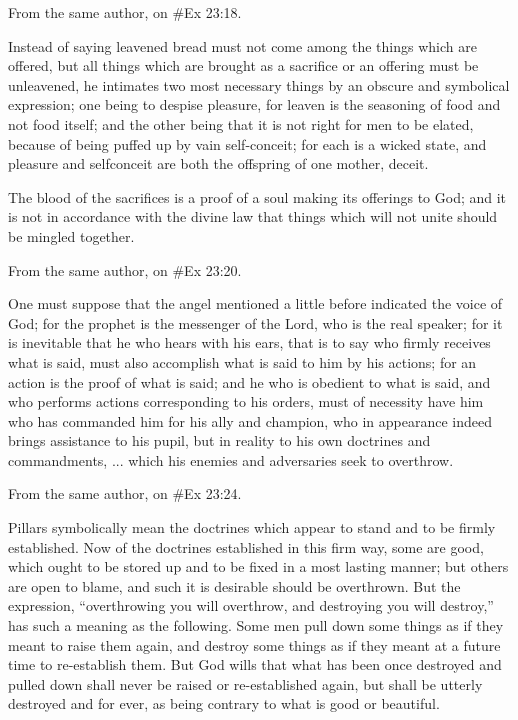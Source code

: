 From the same author, on \#Ex 23:18.

Instead of saying leavened bread must not come among the things which are offered, but all things
which are brought as a sacrifice or an offering must be unleavened, he intimates two most
necessary things by an obscure and symbolical expression; one being to despise pleasure, for
leaven is the seasoning of food and not food itself; and the other being that it is not right for men to
be elated, because of being puffed up by vain self-conceit; for each is a wicked state, and
pleasure and selfconceit are both the offspring of one mother, deceit.

The blood of the sacrifices is a proof of a soul making its offerings to God; and it is not in
accordance with the divine law that things which will not unite should be mingled together.

From the same author, on \#Ex 23:20.

One must suppose that the angel mentioned a little before indicated the voice of God; for the
prophet is the messenger of the Lord, who is the real speaker; for it is inevitable that he who hears
with his ears, that is to say who firmly receives what is said, must also accomplish what is said to
him by his actions; for an action is the proof of what is said; and he who is obedient to what is said,
and who performs actions corresponding to his orders, must of necessity have him who has
commanded him for his ally and champion, who in appearance indeed brings assistance to his
pupil, but in reality to his own doctrines and commandments, ... which his enemies and adversaries
seek to overthrow.

From the same author, on \#Ex 23:24.

Pillars symbolically mean the doctrines which appear to stand and to be firmly established. Now of
the doctrines established in this firm way, some are good, which ought to be stored up and to be
fixed in a most lasting manner; but others are open to blame, and such it is desirable should be
overthrown. But the expression, ``overthrowing you will overthrow, and destroying you will destroy,''
has such a meaning as the following. Some men pull down some things as if they meant to raise
them again, and destroy some things as if they meant at a future time to re-establish them. But
God wills that what has been once destroyed and pulled down shall never be raised or
re-established again, but shall be utterly destroyed and for ever, as being contrary to what is good
or beautiful.

